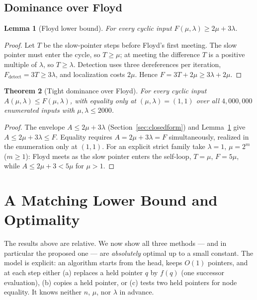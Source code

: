 \documentclass[11pt]{article}
\newtheorem{theorem}{Theorem}[section]
\newtheorem{lemma}[theorem]{Lemma}
\begin{document}
\subsection{Dominance over Floyd}

\begin{lemma}[Floyd lower bound]
\label{lem:floyd-lower}
For every cyclic input $F(\mu,\lambda)\ge 2\mu+3\lambda$.
\end{lemma}

\begin{proof}
Let $T$ be the slow-pointer steps before Floyd's first meeting. The slow pointer
must enter the cycle, so $T\ge\mu$; at meeting the difference $T$ is a positive
multiple of $\lambda$, so $T\ge\lambda$. Detection uses three dereferences per
iteration, $F_{\mathrm{detect}}=3T\ge3\lambda$, and localization costs $2\mu$.
Hence $F=3T+2\mu\ge3\lambda+2\mu$.
\end{proof}

\begin{theorem}[Tight dominance over Floyd]
\label{thm:floyd}
For every cyclic input $A(\mu,\lambda)\le F(\mu,\lambda)$, with equality only at
$(\mu,\lambda)=(1,1)$ over all $4{,}000{,}000$ enumerated inputs with
$\mu,\lambda\le2000$.
\end{theorem}

\begin{proof}
The envelope $A\le2\mu+3\lambda$ (Section~\ref{sec:closedform}) and
Lemma~\ref{lem:floyd-lower} give $A\le2\mu+3\lambda\le F$. Equality requires
$A=2\mu+3\lambda=F$ simultaneously, realized in the enumeration only at $(1,1)$.
For an explicit strict family take $\lambda=1$, $\mu=2^m$ ($m\ge1$): Floyd meets
as the slow pointer enters the self-loop, $T=\mu$, $F=5\mu$, while
$A\le2\mu+3<5\mu$ for $\mu>1$.
\end{proof}

\section{A Matching Lower Bound and Optimality}
\label{sec:lowerbound}

The results above are relative. We now show all three methods --- and in
particular the proposed one --- are \emph{absolutely} optimal up to a small
constant. The model is explicit: an algorithm starts from the head, keeps $O(1)$
pointers, and at each step either (a) replaces a held pointer $q$ by $f(q)$ (one
successor evaluation), (b) copies a held pointer, or (c) tests two held pointers
for node equality. It knows neither $n$, $\mu$, nor $\lambda$ in advance.
\end{document}
